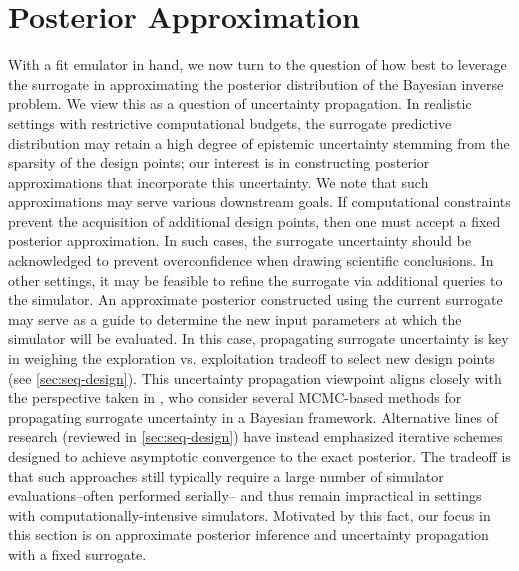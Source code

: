 \documentclass[12pt]{article}
\begin{document}
\section{Posterior Approximation} \label{sec:post-approx}
With a fit emulator in hand, we now turn to the question of how best to leverage the surrogate in approximating the 
posterior distribution of the Bayesian inverse problem. We view this as a question of uncertainty propagation. 
In realistic settings with restrictive computational budgets, the surrogate predictive distribution may retain a high degree of 
epistemic uncertainty stemming from the sparsity of the design points; our interest is in constructing posterior 
approximations that incorporate this uncertainty. We note that such approximations 
may serve various downstream goals. If computational constraints prevent the acquisition of additional 
design points, then one must accept a fixed posterior approximation.
In such cases, the surrogate uncertainty should be acknowledged to prevent 
overconfidence when drawing scientific conclusions. In other settings, it may be feasible to refine the surrogate 
via additional queries to the simulator. An approximate posterior constructed using the current 
surrogate may serve as a guide to determine the new input parameters at which the simulator will be 
evaluated. In this case, propagating surrogate uncertainty is key in weighing the exploration vs. exploitation 
tradeoff to select new design points (see \cref{sec:seq-design}).
This uncertainty propagation viewpoint aligns closely with the perspective taken in 
\citep{BurknerSurrogate,BurknerTwoStep}, 
who consider several MCMC-based methods for propagating surrogate uncertainty in a Bayesian framework. 
Alternative lines of research (reviewed in \cref{sec:seq-design}) have instead emphasized iterative schemes 
designed to achieve asymptotic convergence to the exact posterior. The tradeoff is that such approaches 
still typically require a large number of simulator evaluations--often performed serially-- and thus remain 
impractical in settings with computationally-intensive simulators.
Motivated by this fact, our focus in this section is on approximate posterior inference and uncertainty propagation
with a fixed surrogate.
\end{document}
